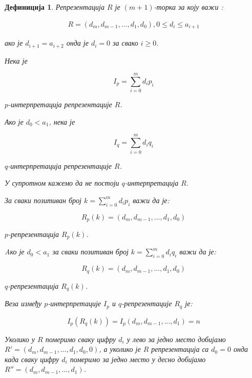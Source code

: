 \documentclass[a4paper]{article}
\newtheorem{definition}{Дефиниција}
\begin{document}
\begin{definition}
	Репрезентација $ R $ је  $ (m+1) $-торка за коју важи :

		\begin{eqnarray}
			R = (d_{m}, d_{m-1}, ... , d_{1}, d_{0}), 0 \le d_{i} \le a_{i+1}
		\end{eqnarray}

	ако је $ d_{i+1} = a_{i+2} $ онда је $ d_{i} = 0 $ за свако $ i \ge 0 $.

	Нека је 
	
		\begin{displaymath}
			I_{p} = \sum_{i=0}^{m} d_{i}p_{i}
		\end{displaymath} 		
	
	$ p $-интерпретација репрезентације $ R $. 
	
	Ако је $ d_{0} < a_{1} $, нека је 
	
		\begin{displaymath}
			I_{q} = \sum_{i=0}^{m} d_{i}q_{i}
		\end{displaymath}  
	
	$ q $-интерпретација репрезентације $ R $. 
	
	У супротном кажемо да не постоји $ q $-интерпретација $ R $.
	
	За сваки позитиван број $ k = \sum_{i=0}^{m} d_{i}p_{i} $ важи да је: 
	
		\begin{displaymath}
			R_{p}(k) = (d_{m}, d_{m-1}, ... , d_{1}, d_{0})
		\end{displaymath}
	
	$ p $-репрезентација $ R_{p}(k) $.
	
	Aко је $ d_{0} < a_{1} $ за сваки позитиван број $ k = \sum_{i=0}^{m} d_{i}q_{i} $ важи да је:
	
		\begin{displaymath}
			R_{q}(k) = (d_{m}, d_{m-1}, ... , d_{1}, d_{0})
		\end{displaymath}
	
	 $ q $-репрезентација $ R_{q}(k) $. 
	
	Веза између $ p $-интерпретације $ I_{p} $ и $ q $-репрезентације $ R_{q} $ је:
	
	\begin{displaymath}
		I_{p}(R_{q}(k)) = I_{p}(d_{m}, d_{m-1}, ..., d_{1}) = n
	\end{displaymath}
	
	Уколико у $ R $ померимо сваку цифру $ d_{i} $ у лево за једно место добијамо $ R' = (d_{m}, d_{m-1}, ... , d_{1}, d_{0}, 0) $, а уколико је $ R $ репрезентација са $ d_{0} = 0 $ онда када сваку цифру $ d_{i} $ померимо за једно место у десно добијамо $ R'' = (d_{m}, d_{m-1}, ... , d_{1}) $. 
\end{definition}
\end{document}
